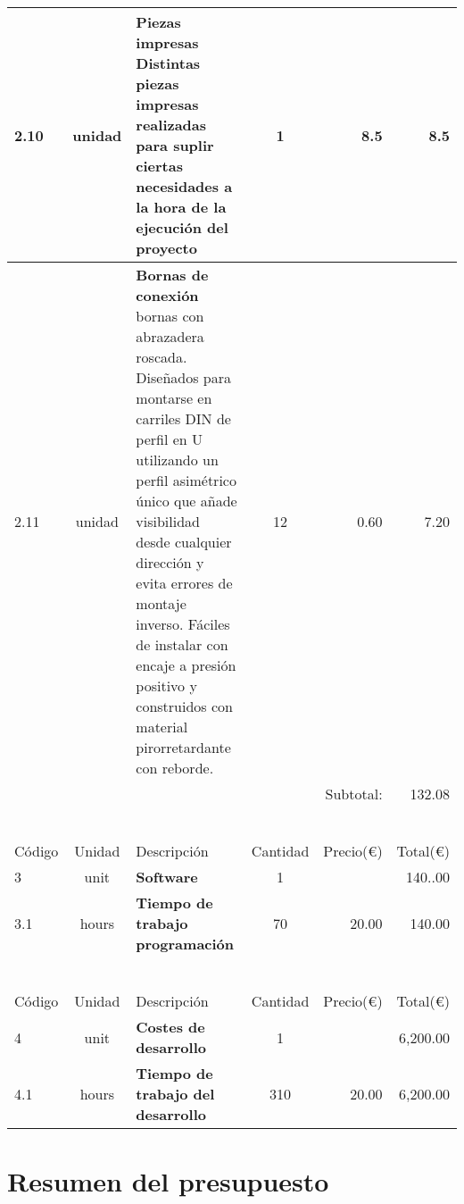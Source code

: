 \begin{longtable}{l c p{7cm} c r r}
    2.10 & unidad & \textbf{Piezas impresas} \newline \small Distintas piezas impresas realizadas para suplir ciertas necesidades a la hora de la ejecución del proyecto & 1 & 8.5 & 8.5\\ \hline
  
    2.11 & unidad & \textbf{Bornas de conexión} \newline \small bornas con abrazadera roscada. Diseñados para montarse en carriles DIN de perfil en U utilizando un perfil asimétrico único que añade visibilidad desde cualquier dirección y evita errores de montaje inverso. Fáciles de instalar con encaje a presión positivo y construidos con material pirorretardante con reborde. & 12 & 0.60 & 7.20  \\ \hline
    
    &&&& Subtotal: &132.08\\

     \\~\\  \hline

    Código & Unidad & Descripción  & Cantidad & Precio(\euro) & Total(\euro)  \\ \hline \hline \hline \hline
    3 & unit & \textbf{Software} & 1 & \multicolumn{1}{r}{} & 140..00 \\ \hline
    3.1 & hours & \textbf{Tiempo de trabajo programación} & 70 & 20.00 & 140.00 \\ \hline  
    
    \\~\\ \hline
    
    Código & Unidad & Descripción  & Cantidad & Precio(\euro) & Total(\euro)  \\ \hline \hline \hline \hline
    4 & unit & \textbf{Costes de desarrollo} & 1 & \multicolumn{1}{r}{} & 6,200.00 \\ \hline
    4.1 & hours & \textbf{Tiempo de trabajo del desarrollo} & 310 & 20.00 & 6,200.00 \\ \hline  
   
\end{longtable}

\newpage
\section{Resumen del presupuesto}


